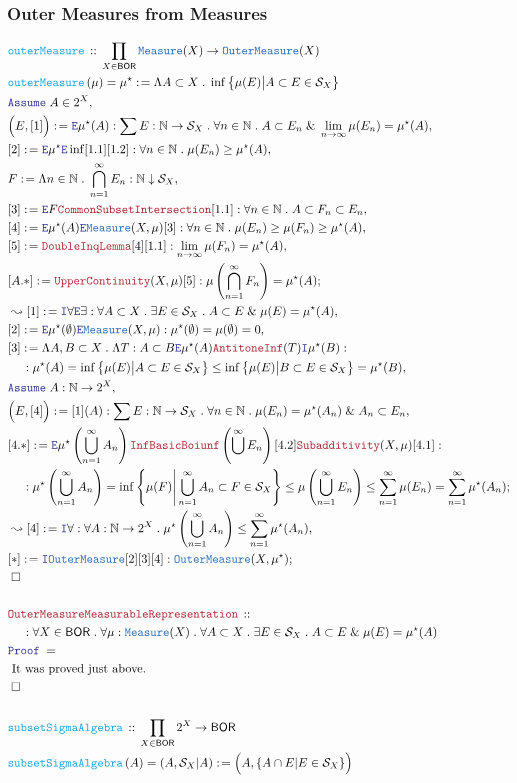 \documentclass[12pt]{scrartcl}
\newcommand{\TYPE}[1]{\textcolor{NavyBlue}{\mathtt{#1}}}
\newcommand{\FUNC}[1]{\textcolor{Cerulean}{\mathtt{#1}}}
\newcommand{\LOGIC}[1]{\textcolor{Blue}{\mathtt{#1}}}
\newcommand{\THM}[1]{\textcolor{Maroon}{\mathtt{#1}}}
\renewcommand{\.}{\; . \;}
\newcommand{\de}{: \kern 0.1pc =}
\newcommand{\Act}[1]{\left( #1 \right)}
\newcommand{\Theorem}[2]{& \THM{#1} \, :: \, #2 \\ & \Proof = \\ }
\newcommand{\DeclareFunc}[2]{& \FUNC{#1} \, :: \, #2 \\}
\newcommand{\DefineNamedFunc}[4]{&  \FUNC{#1}\Act{#2} = #3 \de #4 \\}
\newcommand{\NewLine}{\\ & \kern 1pc}
\newcommand{\Page}[1]{ \begin{align*} #1 \end{align*}   }
\renewcommand{\And}{\; \& \;}
\newcommand{\Intro}{\LOGIC{I}}
\newcommand{\Elim}{\LOGIC{E}}
\newcommand{\Nat}{\mathbb{N} }
\newcommand{\Say}[3]{& #1 \de #2 : #3, \\}
\newcommand{\Conclude}[3]{& #1 \de #2 : #3; \\}
\newcommand{\Derive}[3]{& \leadsto #1 \de #2 : #3, \\}
\newcommand{\Assume}[2]{& \LOGIC{Assume} \; #1 : #2, \\}
\newcommand{\AssumeIn}[2]{& \LOGIC{Assume} \; #1 \in #2, \\}
\newcommand{\QED}{\; \square}
\newcommand{\EndProof}{& \QED \\}
\newcommand{\Proof}{\LOGIC{Proof} \; }
\newcommand{\Explain}[1]{& \text{#1.} \\}
\newcommand{\BOR}{\mathsf{BOR}}
\renewcommand{\S}{\mathcal{S}}
\newcommand{\Measure}{\TYPE{Measure}}
\newcommand{\OM}{\TYPE{OuterMeasure}}
\begin{document}
\subsubsection{Outer Measures from Measures}
\Page{
	\DeclareFunc{outerMeasure}
	{
		\prod_{X \in \BOR} \Measure(X) \to \OM(X)
	}
	\DefineNamedFunc{outerMeasure}{\mu}{\mu^\star}
	{
		\Lambda A \subset X \.  
		\inf \big\{  \mu(E) \big|   A \subset E \in \S_X     \big\}
	}
	\AssumeIn{A}{2^X}
	\Say{\Big( E, [1] \Big)}{\Elim \mu^\star(A)}
	{
		\sum E : \Nat \to \S_X  \.
		\forall n \in \Nat \. A \subset E_n \And
		\lim_{n \to \infty} \mu(E_n) = \mu^\star(A)
	}
	\Say{[2]}{\Elim \mu^\star \Elim \inf [1.1][1.2]}
	{
		\forall n \in \Nat \. \mu(E_n) \ge \mu^\star(A)
	}
	\Say{F}{\Lambda n \in \Nat \. \bigcap^\infty_{n=1} E_n }{\Nat \downarrow \S_X}
	\Say{[3]}{\Elim F \THM{CommonSubsetIntersection} [1.1]}
	{
		\forall n \in \Nat \. A \subset F_n \subset E_n
	}
	\Say{[4]}{
			\Elim \mu^\star(A) \Elim \Measure(X,\mu)[3]	
	}
	{
		\forall n \in \Nat \.  \mu(E_n) \ge \mu(F_n) \ge \mu^\star(A)
	}
	\Say{[5]}{\THM{DoubleInqLemma}[4][1.1]}
	{
		\lim_{n \to \infty} \mu(F_n) = \mu^\star(A)
	}
	\Conclude{[A.*]}{\THM{UpperContinuity}(X,\mu)[5]}
	{
		\mu\left( \bigcap^\infty_{n=1} F_n \right) = \mu^\star(A)
	}
	\Derive{[1]}{\Intro \forall \Elim \exists}
	{
		\forall A \subset X\. \exists E \in \S_X \.  A \subset E 
		\And \mu(E) = \mu^\star(A)  
	}
	\Say{[2]}{\Elim\mu^\star(\emptyset) \Elim \Measure (X, \mu) }
	{\mu^\star(\emptyset) = \mu(\emptyset) = 0}
	\Say{[3]}{
		\Lambda A,B \subset X \. 
		\Lambda T : A \subset B
		\Elim	\mu^\star(A)
		\THM{AntitoneInf}(T)
		\Intro \mu^\star(B)
	}
	{
		\NewLine :		
		\mu^\star(A) =  \inf \big\{  \mu(E) \big|   A \subset E \in \S_X     \big\} 
		\le \inf \big\{  \mu(E) \big|   B \subset E \in \S_X     \big\}  =
		\mu^\star(B)
	}
	\Assume{A}{\Nat \to 2^X}
	\Say{\Big(E,[4]\Big)}{[1](A)}
	{
		\sum E : \Nat \to \S_X \. \forall n \in \Nat \. 
		\mu(E_n) = \mu^\star(A_n) \And A_n \subset E_n
	}
	\Conclude{[4.*]}{
		\Elim \mu^\star\left( \bigcup^\infty_{n=1} A_n \right)
		\THM{InfBasicBoiunf} \left( \bigcup^\infty E_n  \right)[4.2]
		\THM{Subadditivity}(X,\mu)
		[4.1] 	
	}
	{
		\NewLine :		
		\mu^\star\left( \bigcup^\infty_{n=1} A_n \right) =
		\inf \left\{  \mu(F)  \Bigg|   \bigcup^\infty_{n=1} A_n \subset  F \in \S_X  \right\} \le 
		\mu\left( \bigcup^\infty_{n=1} E_n \right) \le
		\sum^\infty_{n=1} \mu(E_n) =
		\sum^\infty_{n=1} \mu^\star(A_n)
	}
	\Derive{[4]}{\Intro \forall}
	{
		\forall A : \Nat \to 2^X \.
		\mu^\star\left( \bigcup^\infty_{n=1} A_n \right) \le
		 \sum^\infty_{n=1} \mu^\star(A_n)
	}
	\Conclude{[*]}{\Intro \OM [2][3][4]}{\OM(X,\mu^\star)}
	\EndProof
	\\
	\Theorem{OuterMeasureMeasurableRepresentation}
	{
		\NewLine : 		
		\forall X \in \BOR \. \forall \mu : \Measure(X) \.		
		\forall A \subset X\. \exists E \in \S_X \.  A \subset E 
		\And \mu(E) = \mu^\star(A)
	}
	\Explain{ It was proved just above}
	\EndProof
	\\
	\DeclareFunc{subsetSigmaAlgebra}{\prod_{X \in \BOR} 2^X \to \BOR}
	\DefineNamedFunc{subsetSigmaAlgebra}{A}{(A,\S_X|A)}
	{
		\Big(A, \{ A \cap E | E \in \S_X \} \Big)	
	}
}
\end{document}
